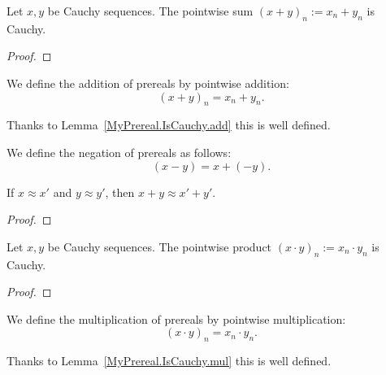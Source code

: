 \begin{lemma}
    \label{MyPrereal.IsCauchy.add}
    \leanok
    Let $x,y$ be Cauchy sequences.
    The pointwise sum $(x + y)_n := x_n + y_n$ is Cauchy.
\end{lemma}
\begin{proof}
    \leanok
\end{proof}

\begin{definition}
    \label{MyPrereal.add}
    \leanok
    We define the addition of prereals by pointwise addition:
    \[
    (x+y)_n = x_n + y_n.
    \]

    Thanks to Lemma~\ref{MyPrereal.IsCauchy.add} this is well defined.
\end{definition}

\begin{definition}
    \label{MyPrereal.sub}
    \leanok
    We define the negation of prereals as follows:
    \[
    (x-y) = x + (-y).
    \]
\end{definition}

\begin{lemma}
    \label{MyPrereal.add_quotient}
    \leanok
    If $x \approx x'$ and $y \approx y'$, then $x+y \approx x'+y'$.
\end{lemma}
\begin{proof}
    \leanok
\end{proof}

\begin{lemma}
    \label{MyPrereal.IsCauchy.mul}
    \leanok
    Let $x,y$ be Cauchy sequences.
    The pointwise product $(x \cdot y)_n := x_n \cdot y_n$ is Cauchy.
\end{lemma}
\begin{proof}
    \leanok
\end{proof}

\begin{definition}
    \label{MyPrereal.mul}
    \leanok
    We define the multiplication of prereals by pointwise multiplication:
    \[
    (x \cdot y)_n = x_n \cdot y_n.
    \]

    Thanks to Lemma~\ref{MyPrereal.IsCauchy.mul} this is well defined.
\end{definition}

